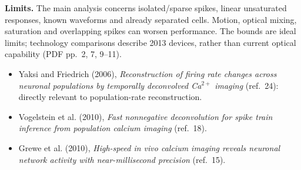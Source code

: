 \textbf{Limits.} The main analysis concerns isolated/sparse spikes,
linear unsaturated responses, known waveforms and already separated cells.
Motion, optical mixing, saturation and overlapping spikes can worsen
performance. The bounds are ideal limits; technology comparisons describe
2013 devices, rather than current optical capability (PDF pp.~2, 7, 9--11).

\begin{itemize}
\item Yaksi and Friedrich (2006), \emph{Reconstruction of firing rate changes
across neuronal populations by temporally deconvolved Ca$^{2+}$ imaging}
(ref.~24): directly relevant to population-rate reconstruction.
\item Vogelstein et al. (2010), \emph{Fast nonnegative deconvolution for
spike train inference from population calcium imaging} (ref.~18).
\item Grewe et al. (2010), \emph{High-speed in vivo calcium imaging reveals
neuronal network activity with near-millisecond precision} (ref.~15).
\end{itemize}


